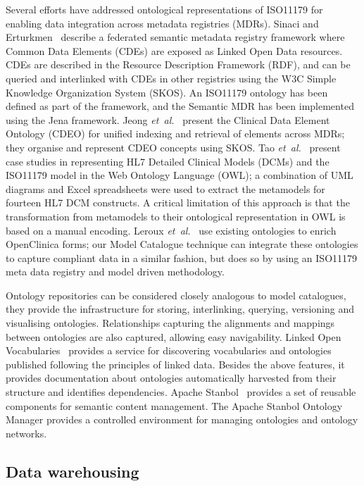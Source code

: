 \documentclass[a4paper,twoside]{article}
\begin{document}
Several efforts have addressed ontological representations of ISO11179 
for enabling data integration across metadata
registries (MDRs). Sinaci and Erturkmen~\cite{Sinaci2013784} describe a
federated semantic metadata registry framework where Common Data
Elements (CDEs) are exposed as Linked Open Data resources. CDEs are
described in the Resource Description Framework (RDF), and can be queried and interlinked with CDEs in other
registries using the W3C Simple Knowledge Organization System (SKOS). 
An ISO11179 ontology has been defined as part of
the framework, and the Semantic MDR has been implemented using the Jena
framework. 
Jeong \textit{et~al.}~\cite{pmid25405066} present the Clinical
Data Element Ontology (CDEO) for unified indexing and retrieval of
elements across MDRs; they organise and
represent CDEO concepts using SKOS. 
Tao \textit{et~al.}~\cite{pmid22211181} present
case studies in representing HL7 Detailed Clinical Models (DCMs) and
the ISO11179 model in the Web Ontology Language (OWL);
a combination of UML diagrams and Excel
spreadsheets were used to extract the metamodels for fourteen HL7 DCM
constructs. A critical limitation of this approach is that the
transformation from metamodels to their ontological representation in
OWL is based on a manual encoding. 
Leroux \textit{et~al.}~\cite{lero12} use existing
ontologies to enrich OpenClinica forms; our Model Catalogue
technique can integrate these ontologies to capture compliant data in
a similar fashion, but does so by using an ISO11179 meta data registry
and model driven methodology.

Ontology repositories can be considered closely analogous to model
catalogues, they provide the infrastructure for storing, interlinking,
querying, versioning and visualising ontologies. Relationships
capturing the alignments and mappings between ontologies are also
captured, allowing easy navigability. Linked Open
Vocabularies~\cite{LOV} provides a service for discovering
vocabularies and ontologies published following the principles of
linked data. Besides the above features, it provides documentation
about ontologies automatically harvested from their structure and
identifies dependencies. Apache Stanbol~\cite{Stanbol} provides a set
of reusable components for semantic content management. The Apache
Stanbol Ontology Manager provides a controlled environment for
managing ontologies and ontology networks. 


\subsection{Data warehousing}
\end{document}
